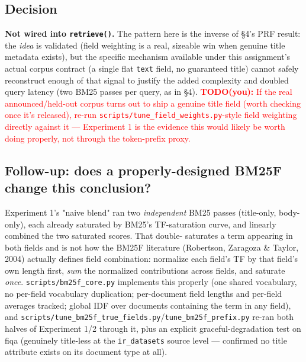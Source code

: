 \documentclass[11pt]{article}
\newcommand{\todo}[1]{\textcolor{red}{\textbf{TODO(you):} #1}}
\begin{document}
\subsection{Decision}
\textbf{Not wired into \texttt{retrieve()}.} The pattern here is the
inverse of \S 4's PRF result: the \emph{idea} is validated (field
weighting is a real, sizeable win when genuine title metadata exists),
but the specific mechanism available under this assignment's actual
corpus contract (a single flat \texttt{text} field, no guaranteed title)
cannot safely reconstruct enough of that signal to justify the added
complexity and doubled query latency (two BM25 passes per query, as in
\S 4). \todo{If the real announced/held-out corpus turns out to ship a
genuine title field (worth checking once it's released), re-run
\texttt{scripts/tune\_field\_weights.py}-style field weighting directly
against it --- Experiment 1 is the evidence this would likely be worth
doing properly, not through the token-prefix proxy.}

\subsection{Follow-up: does a properly-designed BM25F change this conclusion?}
Experiment 1's "naive blend" ran two \emph{independent} BM25 passes
(title-only, body-only), each already saturated by BM25's TF-saturation
curve, and linearly combined the two saturated scores. That double-
saturates a term appearing in both fields and is not how the BM25F
literature (Robertson, Zaragoza \& Taylor, 2004) actually defines field
combination: normalize each field's TF by that field's own length
first, \emph{sum} the normalized contributions across fields, and
saturate \emph{once}. \texttt{scripts/bm25f\_core.py} implements this
properly (one shared vocabulary, no per-field vocabulary duplication;
per-document field lengths and per-field averages tracked; global IDF
over documents containing the term in any field), and
\texttt{scripts/tune\_bm25f\_true\_fields.py}/\texttt{tune\_bm25f\_prefix.py}
re-ran both halves of Experiment 1/2 through it, plus an explicit
graceful-degradation test on fiqa (genuinely title-less at the
\texttt{ir\_datasets} source level --- confirmed no title attribute
exists on its document type at all).
\end{document}
